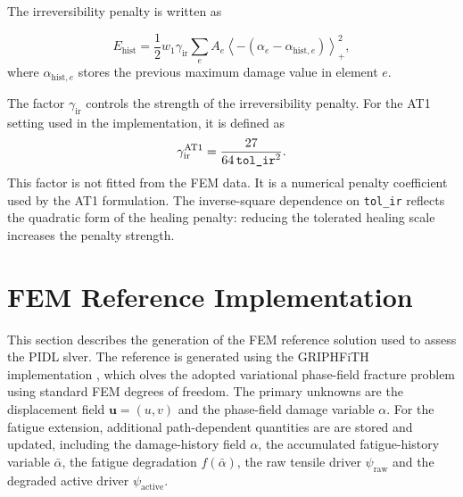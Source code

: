 The irreversibility penalty is written as

\begin{equation}
    E_{\mathrm{hist}}
    =
    \frac{1}{2}w_1\gamma_{\mathrm{ir}}
    \sum_e
    A_e
    \left\langle
    -(\alpha_e-\alpha_{\mathrm{hist},e})
    \right\rangle_+^2 ,
    \label{eq:c3_history_penalty}
\end{equation}
where $\alpha_{\mathrm{hist},e}$ stores the previous maximum damage value in element $e$.

The factor $\gamma_{\mathrm{ir}}$ controls the strength of the irreversibility penalty. For the AT1 setting used in the implementation, it is defined as
\begin{equation}
    \gamma_{\mathrm{ir}}^{\mathrm{AT1}}
    =
    \frac{27}{64\,\text{\texttt{tol\_ir}}^2}.
    \label{eq:c3_irreversibility_factor}
\end{equation}
This factor is not fitted from the FEM data. It is a numerical penalty coefficient used by the AT1 formulation. The inverse-square dependence on \texttt{tol\_ir} reflects the quadratic form of the healing penalty: reducing the tolerated healing scale increases the penalty strength.


\section{FEM Reference Implementation}
\label{sec:c3_fem_reference_impl}


This section describes the generation of the FEM reference solution used to assess the PIDL slver. The reference is generated using the GRIPHFiTH implementation \cite{Manav2024cmame}, which olves the adopted variational phase-field fracture problem using standard FEM degrees of freedom. The primary unknowns are the displacement field \(\mathbf{u}=(u,v)\) and the phase-field damage variable \(\alpha\). For the fatigue extension, additional path-dependent quantities are are stored and updated, including the damage-history field \(\alpha\), the accumulated fatigue-history variable \(\bar{\alpha}\), the fatigue degradation \(f(\bar{\alpha})\), the raw tensile driver \(\psi_{\mathrm{raw}}\) and the degraded active driver \(\psi_{\mathrm{active}}\).

